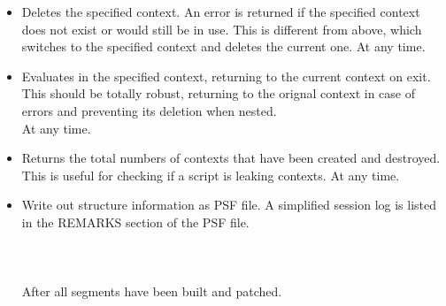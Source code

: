 \begin{itemize}
\item {}
{Deletes the specified context.  An error is returned if the
specified context does not exist or would still be in use.
This is different from  above,
which switches to the specified context and deletes the current one.}
{}
{At any time.}

\item {}
{Evaluates  in the specified context, returning to the current
context on exit.  This should be totally robust, returning to the orignal
context in case of errors and preventing its deletion when nested.}
{\\
}
{At any time.}

\item {}
{Returns the total numbers of contexts that have been created and destroyed.
This is useful for checking if a script is leaking contexts.}
{}
{At any time.}

\item {}
{Write out structure information as PSF file. A simplified session log is listed in the REMARKS 
section of the PSF file.}
{ \\
\\
\\
\\
}
{After all segments have been built and patched.}


\end{itemize}
